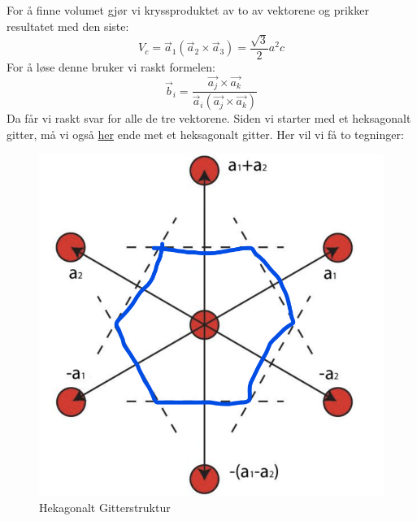 \documentclass{article}
\begin{document}
For å finne volumet gjør vi kryssproduktet av to av vektorene og prikker resultatet med den siste:
\begin{equation}
    V_c = \vec{a}_1 (\vec{a}_2 \times \vec{a}_3) = \frac{\sqrt{3}}{2} a^2 c
\end{equation}
For å løse denne bruker vi raskt formelen:
\begin{equation}
    \vec{b}_i = \frac{\vec{a_j} \times \vec{a_k}}{ \vec{a}_i (\vec{a_j} \times \vec{a_k})}
\end{equation}
Da får vi raskt svar for alle de tre vektorene.
Siden vi starter med et heksagonalt gitter, må vi også \underline{her} ende met et heksagonalt gitter.
Her vil vi få to tegninger:
\begin{figure}[H]
    \centering
    \begin{minipage}[b]{0.45\linewidth}
        \centering
        \includegraphics[width=\linewidth]{bilder_lf/heksagonalt_gitter_vektorer.png}
        \caption{Hekagonalt Gitterstruktur}
        \label{fig:heksagonalt_gitter_vektorer}
    \end{minipage}
    \hspace{0.5cm}
    \begin{minipage}[b]{0.45\linewidth}
        \centering

\end{minipage}
\end{figure}
\end{document}
